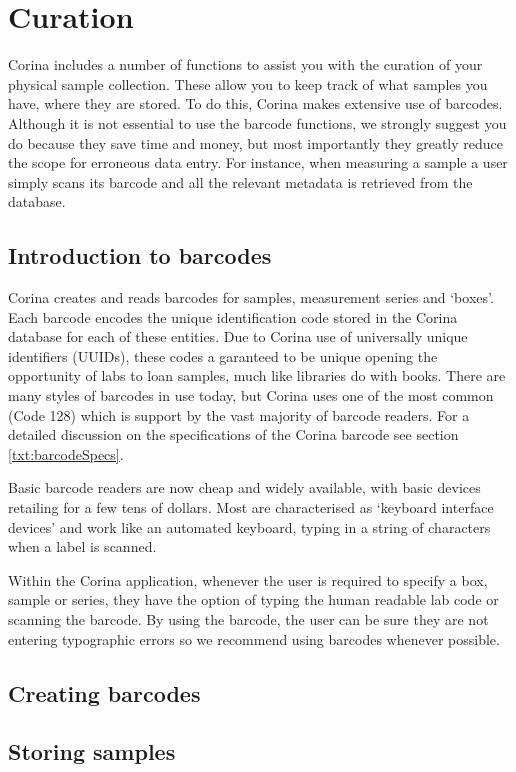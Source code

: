 \chapter{Curation}

Corina includes a number of functions to assist you with the curation of your physical sample collection.  These allow you to keep track of what samples you have, where they are stored.  To do this, Corina makes extensive use of barcodes.  Although it is not essential to use the barcode functions, we strongly suggest you do because they save time and money, but most importantly they greatly reduce the scope for erroneous data entry.  For instance, when measuring a sample a user simply scans its barcode and all the relevant metadata is retrieved from the database.

\section{Introduction to barcodes}
\label{txt:barcodes}

Corina creates and reads barcodes for samples, measurement series and `boxes'.  Each barcode encodes the unique identification code stored in the Corina database for each of these entities.  Due to Corina use of universally unique identifiers (UUIDs), these codes a garanteed to be unique opening the opportunity of labs to loan samples, much like libraries do with books.  There are many styles of barcodes in use today, but Corina uses one of the most common (Code 128) which is support by the vast majority of barcode readers.  For a detailed discussion on the specifications of the Corina barcode see section \ref{txt:barcodeSpecs}.

Basic barcode readers are now cheap and widely available, with basic devices retailing for a few tens of dollars.  Most are characterised as `keyboard interface devices' and work like an automated keyboard, typing in a string of characters when a label is scanned.  

Within the Corina application, whenever the user is required to specify a box, sample or series, they have the option of typing the human readable lab code or scanning the barcode. By using the barcode, the user can be sure they are not entering typographic errors so we recommend using barcodes whenever possible. 

\section{Creating barcodes}



\section{Storing samples}

